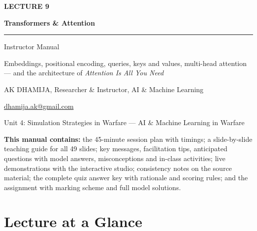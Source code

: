 \documentclass[11pt]{article}
\begin{document}
\begin{titlepage}\centering\vspace*{2.2cm}
{\color{AccN}\large\bfseries LECTURE 9\par}\vspace{0.6cm}
{\color{NavyN}\Huge\bfseries Transformers \& Attention\par}\vspace{0.6cm}
{\color{AccN}\rule{0.7\textwidth}{1.5pt}}\par\vspace{0.6cm}
{\LARGE Instructor Manual\par}\vspace{0.4cm}
{\large\begin{minipage}{0.85\textwidth}\centering Embeddings, positional encoding, queries, keys and values, multi-head attention --- and the architecture of \emph{Attention Is All You Need}\end{minipage}\par}\vspace{2cm}
{\large AK DHAMIJA, Researcher \& Instructor, AI \& Machine Learning\par}\vspace{0.2cm}
{\normalsize \href{mailto:dhamija.ak@gmail.com}{dhamija.ak@gmail.com} \quad\textbullet{}\par}\vspace{0.3cm}
{Unit 4: Simulation Strategies in Warfare --- AI \& Machine Learning in Warfare\par}\vfill
\begin{tcolorbox}[colback=NavyN!4,colframe=NavyN,boxrule=0.6pt,arc=2pt,width=0.9\textwidth]\small
\textbf{This manual contains:} the 45-minute session plan with timings; a slide-by-slide teaching guide for all 49 slides; key messages, facilitation tips, anticipated questions with model answers, misconceptions and in-class activities; live demonstrations with the interactive studio; consistency notes on the source material; the complete quiz answer key with rationale and scoring rules; and the assignment with marking scheme and full model solutions.
\end{tcolorbox}
\end{titlepage}
\tableofcontents\newpage


\section{Lecture at a Glance}
\end{document}
